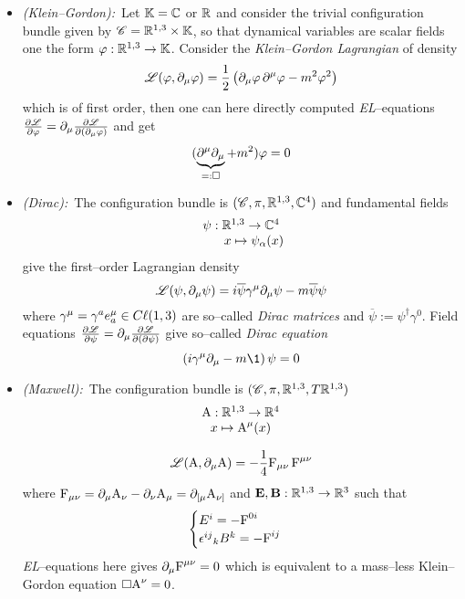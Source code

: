 \begin{example}\label{field_theories}
    \begin{itemize}
        \item \emph{(Klein--Gordon):}\, Let $\mathbb{K}=\mathbb{C}$ or $\mathbb{R}$ and consider the trivial configuration bundle given by  $\mathscr{C}=\mathbb{R}^{1,3}\times\mathbb{K}$, so that dynamical variables are scalar fields one the form $\varphi:\mathbb{R}^{1,3}\to\mathbb{K}$. Consider the \emph{Klein--Gordon Lagrangian} of density
        $$\mathscr{L}(\varphi,   \partial_\mu\varphi)=\frac{1}{2}\left(\partial_\mu\varphi\,\partial^\mu\varphi-m^2\varphi^2\right)$$
        which is of first order, then one can here directly computed \emph{EL}--equations $\frac{\partial\mathscr{L}}{\partial \varphi}=\partial_\mu\frac{\partial\mathscr{L}}{\partial(\partial_\mu\varphi)}$ and get 
        $$(\underbrace{\partial^\mu\partial_\mu}_{=:\square}+m^2)\varphi=0$$
        
        \item \emph{(Dirac):}\, The configuration bundle is $(\mathscr{C},\pi,\mathbb{R}^{1,3},\mathbb{C}^4)$ and fundamental fields
         $$\begin{matrix}
            \psi:\mathbb{R}^{1,3}\to\mathbb{C}^4\\
            \qquad x\mapsto\psi_\alpha(x)
        \end{matrix}$$
        give the first--order Lagrangian density
        $$\mathscr{L}(\psi,\partial_\mu\psi)=i\overline{\psi}\gamma^\mu\partial_\mu\psi-m\overline{\psi}\psi$$
        where $\gamma^\mu=\gamma^a e_a^\mu\in C\ell(1,3)$ are so--called \emph{Dirac matrices} and $\overline{\psi}:=\psi^\dagger\gamma^0$. Field equations $\frac{\partial\mathscr{L}}{\partial\psi}=\partial_\mu\frac{\partial\mathscr{L}}{\partial(\partial\psi)}$ give so--called \emph{Dirac equation}
        $$\left(i\gamma^\mu\der_\mu-m\1\right)\psi=0$$

        \item \emph{(Maxwell):}\, The configuration bundle is $(\mathscr{C},\pi,\mathbb{R}^{1,3},T\mathbb{R}^{1,3})$
         $$\begin{matrix}
            \text{\normalfont A}:\mathbb{R}^{1,3}\to\mathbb{R}^4\\
            x\mapsto\text{\normalfont A}^\mu(x)
        \end{matrix}$$

        $$\mathscr{L}(\text{\normalfont A},\partial_\mu\text{\normalfont A})=-\frac{1}{4}\text{\normalfont F}_{\mu\nu}\,\text{\normalfont F}^{\mu\nu}$$
        where $\text{\normalfont F}_{\mu\nu}=\partial_\mu \text{\normalfont A}_\nu-\partial_\nu\text{\normalfont A}_\mu=\partial_{[\mu}\text{\normalfont A}_{\nu]}$ and $\mathbf{E},\mathbf{B}:\mathbb{R}^{1,3}\to\mathbb{R}^3$ such that
        $$\begin{cases}
            E^i=-\text{\normalfont F}^{0i}\\
            {\epsilon^{ij}}_kB^k=-\text{\normalfont F}^{ij}
        \end{cases}$$
        \emph{EL}--equations here gives $\partial_\mu\text{\normalfont F}^{\mu\nu}=0$ which is equivalent to a mass--less Klein--Gordon equation $\square\text{\normalfont A}^\nu=0$. 
        \,\newline
        

\end{itemize}
\end{example}
